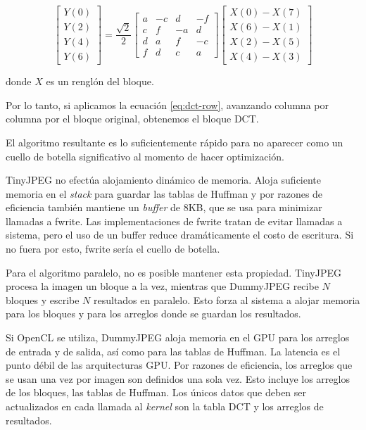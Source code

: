 \begin{equation*}
    \begin{bmatrix}
        Y(0) \\
        Y(2) \\
        Y(4) \\
        Y(6)
    \end{bmatrix}
    = \frac{\sqrt{2}}{2} \begin{bmatrix}
        a & -c & d & -f  \\
        c & f & -a & d  \\
        d & a & f & -c  \\
        f & d & c & a
        \end {bmatrix} \begin {bmatrix}
        X(0) - X(7) \\
        X(6) - X(1) \\
        X(2) - X(5) \\
        X(4) - X(3)
        \end {bmatrix}
\end{equation*}

donde $X$ es un renglón del bloque.

Por lo tanto, si aplicamos la ecuación \ref{eq:dct-row}, avanzando columna por columna por el bloque original, obtenemos el bloque DCT.

El algoritmo resultante es lo suficientemente rápido para no aparecer como un cuello de botella significativo al momento de hacer optimización.

TinyJPEG no efectúa alojamiento dinámico de memoria. Aloja suficiente memoria
en el \emph{stack} para guardar las tablas de Huffman y por razones de
eficiencia también mantiene un \emph{buffer} de 8KB, que se usa para minimizar
llamadas a fwrite. Las implementaciones de fwrite tratan de evitar llamadas a sistema, pero el uso de un buffer reduce dramáticamente el costo de escritura. Si no fuera por esto, fwrite sería el cuello de botella.


Para el algoritmo paralelo, no es posible mantener esta propiedad. TinyJPEG procesa la imagen un bloque a la vez, mientras que DummyJPEG recibe $N$ bloques y escribe $N$ resultados en paralelo. Esto forza al sistema a alojar memoria para los bloques y para los arreglos donde se guardan los resultados.

Si OpenCL se utiliza, DummyJPEG aloja memoria en el GPU para los arreglos de entrada y de salida, así como para las tablas de Huffman. La latencia es el punto débil de las arquitecturas GPU. Por razones de eficiencia, los arreglos que se usan una vez por imagen son definidos una sola vez. Esto incluye los arreglos de los bloques, las tablas de Huffman. Los únicos datos que deben ser actualizados en cada llamada al \emph{kernel} son la tabla DCT y los arreglos de resultados.


